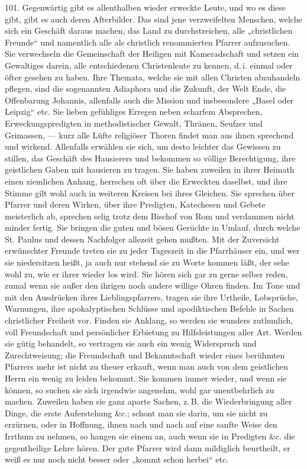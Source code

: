 101. Gegenwärtig gibt es allenthalben wieder erweckte Leute, und wo es diese gibt, gibt es auch deren Afterbilder. Das sind jene verzweifelten Menschen, welche sich ein Geschäft daraus machen, das Land zu durchstreichen, alle „christlichen Freunde“ und namentlich alle als christlich renommierten Pfarrer aufzusuchen. Sie verwechseln die Gemeinschaft der Heiligen mit Kameradschaft und setzen ein Gewaltiges darein, alle entschiedenen Christenleute zu kennen, d.\,i. einmal oder öfter gesehen zu haben. Ihre Themata, welche sie mit allen Christen abzuhandeln pflegen, sind die sogenannten Adiaphora und die Zukunft, der Welt Ende, die Offenbarung Johannis, allenfalls auch die Mission und insbesondere „Basel oder Leipzig“ etc. Sie lieben gefühliges Erregen neben scharfem Absprechen, Erweckungspredigten in methodistischer Gewalt, Thränen, Seufzer und Grimassen, — kurz alle Lüfte religiöser Thoren findet man aus ihnen sprechend und wirkend. Allenfalls erwählen sie sich, um desto leichter das Gewissen zu stillen, das Geschäft des Hausierers und bekommen so völlige Berechtigung, ihre geistlichen Gaben mit hausieren zu tragen. Sie haben zuweilen in ihrer Heimath einen ziemlichen Anhang, herrschen oft über die Erweckten daselbst, und ihre Stimme gilt wohl auch in weiteren Kreisen bei ihres Gleichen. Sie sprechen über Pfarrer und deren
Wirken, über ihre Predigten, Katechesen und Gebete meisterlich ab, sprechen selig trotz dem Bischof von Rom und verdammen nicht minder fertig. Sie bringen die guten und bösen Gerüchte in Umlauf, durch welche St. Paulus und dessen Nachfolger allezeit gehen mußten. Mit der Zuversicht erwünschter Freunde treten sie zu jeder Tageszeit in die Pfarrhäuser ein, und wer sie niedersitzen heißt, ja auch nur stehend sie zu Worte kommen läßt, der sehe wohl zu, wie er ihrer wieder los wird. Sie hören sich gar zu gerne selber reden, zumal wenn sie außer den ihrigen noch andere willige Ohren finden. Im Tone und mit den Ausdrücken ihres Lieblingspfarrers, tragen sie ihre Urtheile, Lobsprüche, Warnungen, ihre apokalyptischen Schlüsse und apodiktischen Befehle in Sachen christlicher Freiheit vor. Finden sie Anklang, so werden sie wunders zuthunlich, voll Freundschaft und persönlicher Erbietung zu Hilfsleistungen aller Art. Werden sie gütig behandelt, so vertragen sie auch ein wenig Widerspruch und Zurechtweisung; die Freundschaft und Bekanntschaft wieder eines berühmten Pfarrers mehr ist nicht zu theuer erkauft, wenn man auch von dem geistlichen Herrn ein wenig zu leiden bekommt. Sie kommen immer wieder, und wenn sie können, so suchen sie sich irgendwie angenehm, wohl gar unentbehrlich zu machen. Zuweilen haben sie ganz aparte Sachen, z.\,B. die Wiederbringung aller Dinge, die erste Auferstehung \&c.; schont man sie darin, um sie nicht zu erzürnen, oder in Hoffnung, ihnen nach und nach auf eine sanfte Weise den Irrthum zu nehmen, so hangen sie einem an, auch wenn sie in Predigten \&c. die gegentheilige Lehre
hören. Der gute Pfarrer wird dann mildiglich beurtheilt, er weiß es nur noch nicht besser oder „kommt schon herbei“ etc.

